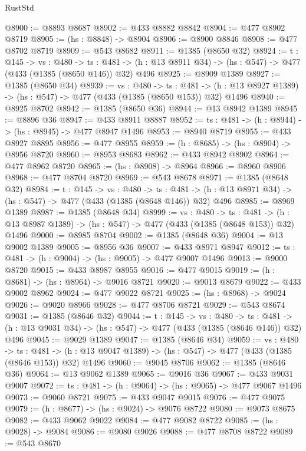 \begin{lexlean}{RustStd}
\begin{coremodule}
{\begin{coremodule}
{{{{{{{{{{{{{{{{@8900 := @8893 @8687
@8902 := @433 @8882 @8842
@8904 := @477 @8902 @8719
@8905 := (hs : @8848) -> @8904
@8906 := @8900 @8846
@8908 := @477 @8702 @8719
@8909 := @543 @8682
@8911 := @1385 (@8650 @32)
@8924 := {t : @145} ->
  {vs : @480} ->
  {ts : @481} -> (h : @13 @8911 @34) -> (hs : @547) -> @477 (@433 (@1385 (@8650 @146)) @32) @496
@8925 := @8909 @1389
@8927 := @1385 (@8650 @34)
@8939 := {vs : @480} ->
  {ts : @481} -> (h : @13 @8927 @1389) -> (hs : @547) -> @477 (@433 (@1385 (@8650 @153)) @32) @1496
@8940 := @8925 @8702
@8942 := @1385 (@8650 @36)
@8944 := @13 @8942 @1389
@8945 := @8896 @36
@8947 := @433 @8911 @8887
@8952 := {ts : @481} -> (h : @8944) -> (hs : @8945) -> @477 @8947 @1496
@8953 := @8940 @8719
@8955 := @433 @8927 @8895
@8956 := @477 @8955
@8959 := (h : @8685) -> (hs : @8904) -> @8956 @8720
@8960 := @8953 @8683
@8962 := @433 @8942 @8902
@8964 := @477 @8962 @8720
@8965 := (hs : @8908) -> @8964
@8966 := @8960 @8906
@8968 := @477 @8704 @8720
@8969 := @543 @8678
@8971 := @1385 (@8648 @32)
@8984 := {t : @145} ->
  {vs : @480} ->
  {ts : @481} -> (h : @13 @8971 @34) -> (hs : @547) -> @477 (@433 (@1385 (@8648 @146)) @32) @496
@8985 := @8969 @1389
@8987 := @1385 (@8648 @34)
@8999 := {vs : @480} ->
  {ts : @481} -> (h : @13 @8987 @1389) -> (hs : @547) -> @477 (@433 (@1385 (@8648 @153)) @32) @1496
@9000 := @8985 @8704
@9002 := @1385 (@8648 @36)
@9004 := @13 @9002 @1389
@9005 := @8956 @36
@9007 := @433 @8971 @8947
@9012 := {ts : @481} -> (h : @9004) -> (hs : @9005) -> @477 @9007 @1496
@9013 := @9000 @8720
@9015 := @433 @8987 @8955
@9016 := @477 @9015
@9019 := (h : @8681) -> (hs : @8964) -> @9016 @8721
@9020 := @9013 @8679
@9022 := @433 @9002 @8962
@9024 := @477 @9022 @8721
@9025 := (hs : @8968) -> @9024
@9026 := @9020 @8966
@9028 := @477 @8706 @8721
@9029 := @543 @8674
@9031 := @1385 (@8646 @32)
@9044 := {t : @145} ->
  {vs : @480} ->
  {ts : @481} -> (h : @13 @9031 @34) -> (hs : @547) -> @477 (@433 (@1385 (@8646 @146)) @32) @496
@9045 := @9029 @1389
@9047 := @1385 (@8646 @34)
@9059 := {vs : @480} ->
  {ts : @481} -> (h : @13 @9047 @1389) -> (hs : @547) -> @477 (@433 (@1385 (@8646 @153)) @32) @1496
@9060 := @9045 @8706
@9062 := @1385 (@8646 @36)
@9064 := @13 @9062 @1389
@9065 := @9016 @36
@9067 := @433 @9031 @9007
@9072 := {ts : @481} -> (h : @9064) -> (hs : @9065) -> @477 @9067 @1496
@9073 := @9060 @8721
@9075 := @433 @9047 @9015
@9076 := @477 @9075
@9079 := (h : @8677) -> (hs : @9024) -> @9076 @8722
@9080 := @9073 @8675
@9082 := @433 @9062 @9022
@9084 := @477 @9082 @8722
@9085 := (hs : @9028) -> @9084
@9086 := @9080 @9026
@9088 := @477 @8708 @8722
@9089 := @543 @8670
}}}}}}}}}}}}}}}}
\end{coremodule}}
\end{coremodule}
\end{lexlean}
